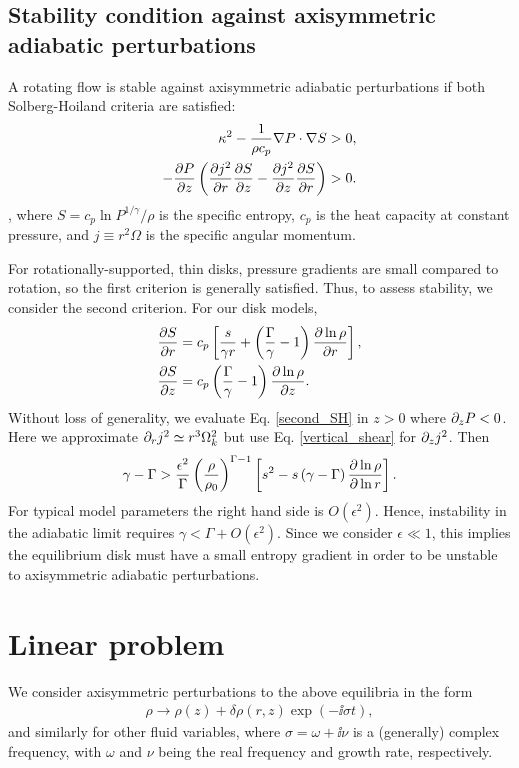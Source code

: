 \subsection{Stability condition against axisymmetric adiabatic
  perturbations}\label{solberg}
A rotating flow is stable against axisymmetric adiabatic perturbations
if both Solberg-Hoiland criteria  are satisfied:
\begin{align}
  \kappa^2 - \frac{1}{\rho c_p}\nabla P \cdot \nabla S &> 0,\\
  -\frac{\partial P}{\partial z}\left(\frac{\partial j^2}{\partial r}\frac{\partial S}{ \partial z} -
    \frac{\partial j^2}{\partial z}\frac{\partial S}{\partial r} \right)&>0. \label{second_SH} 
\end{align}
\citep{tassoul78}, where $S = c_p\ln{P^{1/\gamma}/\rho}$ is the
specific entropy, $c_p$ is the heat capacity at constant
pressure, and $j\equiv r^2\Omega$ is the
specific angular momentum.   

For rotationally-supported, thin disks, pressure gradients are small 
compared to rotation, so the first criterion is generally
satisfied. Thus, to assess stability, we consider the second
criterion. For our disk models,
\begin{align}
  &\frac{\partial S}{\partial r} = c_p\left[\frac{s}{\gamma r} +
    \left(\frac{\Gamma}{\gamma}-1\right)\frac{\partial \ln{\rho}}{\partial
       r}\right],\\
  &\frac{\partial S}{\partial z} = c_p
  \left(\frac{\Gamma}{\gamma}-1\right)\frac{\partial \ln{\rho}}{\partial z}. 
\end{align} 
Without loss of generality, we evaluate Eq. \ref{second_SH} in $z>0$
where $\partial_zP<0$. Here we approximate $\partial_r j^2\simeq r^3\Omega_k^2$ but
use Eq. \ref{vertical_shear} for $\partial_zj^2$. Then 
\begin{align}\label{solberg2}
  \gamma - \Gamma > \frac{\epsilon^2}{\Gamma}
  \left(\frac{\rho}{\rho_0}\right)^{\Gamma-1} \left[s^2
    -s\left(\gamma-\Gamma\right)\frac{\partial\ln{\rho}}{\partial\ln{r}} \right]. 
\end{align} 
For typical model parameters the right hand side is
$O(\epsilon^2)$. Hence, instability in the adiabatic limit 
requires $\gamma < \Gamma + O(\epsilon^2)$. Since we consider
$\epsilon\ll1$, this implies the equilibrium disk must have a small
entropy gradient in order to be unstable to axisymmetric adiabatic
perturbations. 

\section{Linear problem}\label{linear}
We consider axisymmetric perturbations to the above equilibria in the
form 
\begin{align}
  \rho \to \rho(z) + \delta\rho(r,z)\exp{\left( - \ii\sigma
      t\right)},    
\end{align}
and similarly for other fluid variables, where $\sigma = \omega + \ii
\nu$ is a (generally) complex frequency, with $\omega$ and $\nu$ being
the real frequency and growth rate, respectively.

